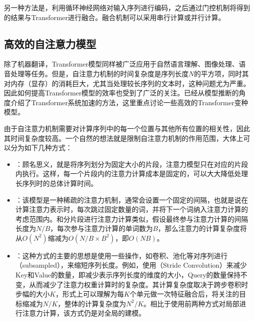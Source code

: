 \parinterval 另一种方法是，利用循环神经网络对输入序列进行编码，之后通过门控机制将得到的结果与Transformer进行融合。融合机制可以采用串行计算或并行计算。


\subsection{高效的自注意力模型}

\parinterval 除了机器翻译，Transformer模型同样被广泛应用于自然语言理解、图像处理、语音处理等任务。但是，自注意力机制的时间复杂度是序列长度$N$的平方项，同时其对内存（显存）的消耗巨大，尤其当处理较长序列的文本时，这种问题尤为严重。因此如何提高Transformer模型的效率也受到了广泛的关注。{\chapterfourteen}已经从模型推断的角度介绍了Transformer系统加速的方法，这里重点讨论一些高效的Transformer变种模型。

\parinterval 由于自注意力机制需要对计算序列中的每一个位置与其他所有位置的相关性，因此其时间复杂度较高。一个自然的想法就是限制自注意力机制的作用范围，大体上可以分为如下几种方式：

\begin{itemize}
\vspace{0.5em}
\item {\small{}}：顾名思义，就是将序列划分为固定大小的片段，注意力模型只在对应的片段内执行。这样，每一个片段内的注意力计算成本是固定的，可以大大降低处理长序列时的总体计算时间。
\vspace{0.5em}
\item {\small{}}：该模型是一种稀疏的注意力机制，通常会设置一个固定的间隔，也就是说在计算注意力表示时，每次跳过固定数量的词，并将下一个词纳入注意力计算的考虑范围内。和分片段进行注意力计算类似，假设最终参与注意力计算的间隔长度为$N/B$，每次参与注意力计算的单词数为$B$，那么注意力的计算复杂度将从$O(N^2)$缩减为$O(N/B \times B^2)$，即$O(NB)$。
\vspace{0.5em}
\item {\small{}}：这种方式的主要的思想是使用一些操作，如卷积、池化等对序列进行{\small{}}（subsampled），来缩短序列长度。例如，使用{\small{}}（Stride Convolution）来减少Key和Value的数量，即减少表示序列长度的维度的大小，Query的数量保持不变，从而减少了注意力权重计算时的复杂度。其计算复杂度取决于跨步卷积时步幅的大小$K$，形式上可以理解为每$K$个单元做一次特征融合后，将关注的目标缩减为$N/K$，整体的计算复杂度为$N^2/K$。相比于使用前两种方式对局部进行注意力计算，该方式仍是对全局的建模。
\vspace{0.5em}
\end{itemize}


